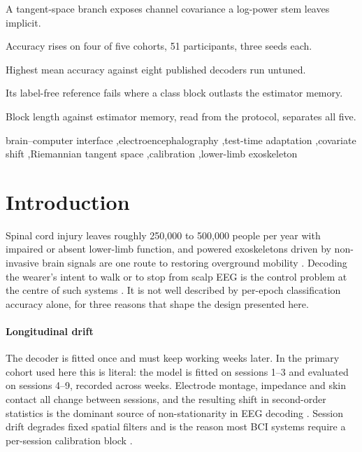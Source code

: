 \documentclass[a4paper,fleqn]{cas-dc}
\begin{document}
\begin{highlights}
\item A tangent-space branch exposes channel covariance a log-power stem leaves implicit.
\item Accuracy rises on four of five cohorts, 51 participants, three seeds each.
\item Highest mean accuracy against eight published decoders run untuned.
\item Its label-free reference fails where a class block outlasts the estimator memory.
\item Block length against estimator memory, read from the protocol, separates all five.
\end{highlights}

\begin{keywords}
brain--computer interface \sep electroencephalography \sep test-time adaptation
\sep covariate shift \sep Riemannian tangent space \sep calibration \sep lower-limb
exoskeleton
\end{keywords}

\maketitle

\section{Introduction}

Spinal cord injury leaves roughly 250{,}000 to 500{,}000 people per year with
impaired or absent lower-limb function, and powered exoskeletons driven by
non-invasive brain signals are one route to restoring overground mobility
\citep{he_exo,lopezlarraz,do}. Decoding the wearer's intent to walk or to stop
from scalp EEG is the control problem at the centre of such systems
\citep{contrerasvidal,presacco}. It is not well described by per-epoch
classification accuracy alone, for three reasons that shape the design presented
here.

\paragraph{Longitudinal drift} The decoder is fitted once and must keep working
weeks later. In the primary cohort used here this is literal: the model is
fitted on sessions 1--3 and evaluated on sessions 4--9, recorded across weeks.
Electrode montage, impedance and skin contact all change between sessions, and
the resulting shift in second-order statistics is the dominant source of
non-stationarity in EEG decoding \citep{shenoy,krauledat,blankertz2008}. Session
drift degrades fixed spatial filters and is the reason most BCI systems require
a per-session calibration block \citep{vidaurre}.
\end{document}
